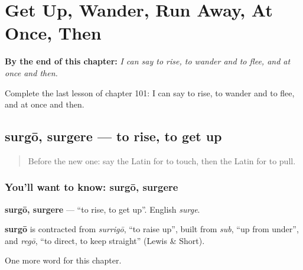 
\chapter{Get Up, Wander, Run Away, At Once, Then}
\label{ch:la-get-up-wander-run-away-at-once-then}

\begin{chapteropening}
\textbf{By the end of this chapter:} \emph{I can say to rise, to wander and to flee, and at once and then.}

Complete the last lesson of chapter 101: I can say to rise, to wander and to flee, and at once and then.
\end{chapteropening}

\section[surgō, surgere]{surgō, surgere — to rise, to get up}

\label{lesson:LA-C101-surgo}



\begin{quote}
Before the new one: say the Latin for to touch, then the Latin for to pull.
\end{quote}

\subsection*{You'll want to know: surgō, surgere}
\textbf{surgō, surgere} — \textquotedblleft{}to rise, to get up\textquotedblright{}. English \emph{surge}.

\begin{cousinweb}
\textbf{surgō} is contracted from \emph{surrigō}, \textquotedblleft{}to raise up\textquotedblright{}, built from \emph{sub}, \textquotedblleft{}up from under\textquotedblright{}, and \emph{regō}, \textquotedblleft{}to direct, to keep straight\textquotedblright{} (Lewis \& Short).
\end{cousinweb}

\begin{grammarlens}[title={What you've built}]
One more word for this chapter.
\end{grammarlens}

